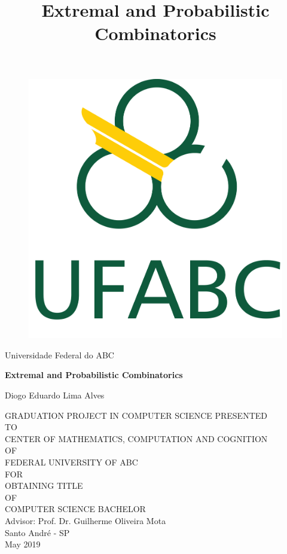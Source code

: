 \documentclass[12pt,twoside,a4paper]{book}
\numberwithin{equation}{section}
\theoremstyle{remark}
\begin{document}

\title{Extremal and Probabilistic Combinatorics}

      \begin{figure}[h!]%
        \centering%
        \includegraphics[scale=0.2]{Figuras/logo.png}%
      \end{figure}%
\begin{center}
Universidade Federal do ABC\\

\vspace{2cm}

{
\fontsize{18pt}{\baselineskip}\selectfont \bf
Extremal and Probabilistic Combinatorics
}

\vspace{2cm}

Diogo Eduardo Lima Alves\\

\vspace{2cm}

GRADUATION PROJECT IN COMPUTER SCIENCE PRESENTED\\
TO\\
CENTER OF MATHEMATICS, COMPUTATION AND COGNITION\\
OF\\
FEDERAL UNIVERSITY OF ABC\\
FOR\\
OBTAINING TITLE\\
OF\\
COMPUTER SCIENCE BACHELOR\\
\vspace{2cm}
Advisor: Prof. Dr. Guilherme Oliveira Mota\\
\vfill
Santo André - SP\\
May 2019
\end{center}
\end{document}
